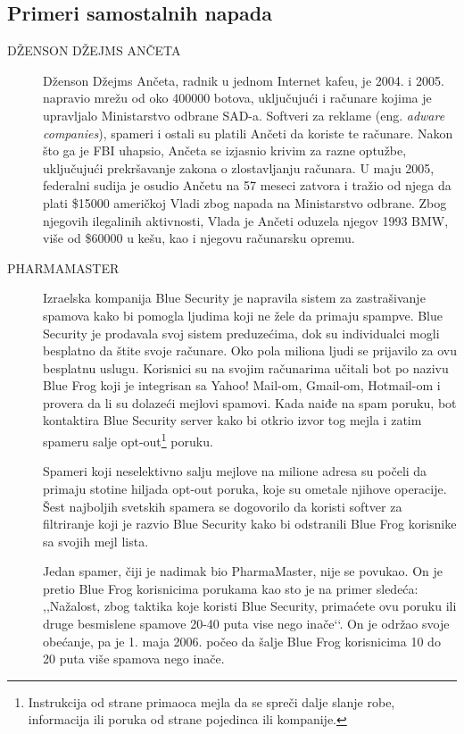 \documentclass[a4paper]{article}
\theoremstyle{break}
\begin{document}
{\subsection{Primeri samostalnih napada}
\label{subsec:primeri_samo_napada}

\begin{description}
\item[DŽENSON DŽEJMS ANČETA] Dženson Džejms Ančeta, radnik u jednom Internet kafeu, je 2004. i 2005. napravio mrežu od oko 400000 botova, uključujući i računare kojima je upravljalo Ministarstvo odbrane SAD-a. Softveri za reklame (eng. {\em adware companies}), spameri i ostali su platili Ančeti da koriste te računare. Nakon što ga je FBI uhapsio, Ančeta se izjasnio krivim za razne optužbe, uključujući prekršavanje zakona o zlostavljanju računara. U maju 2005, federalni sudija je osudio Ančetu na 57 meseci zatvora i tražio od njega da plati \$15000 američkoj Vladi zbog napada na Ministarstvo odbrane. Zbog njegovih ilegalinih aktivnosti, Vlada je Ančeti oduzela njegov 1993 BMW, više od \$60000 u kešu, kao i njegovu računarsku opremu.


\item[PHARMAMASTER] Izraelska kompanija Blue Security je napravila sistem za zastrašivanje spamova kako bi pomogla ljudima koji ne žele da primaju spampve. Blue Security je prodavala svoj sistem preduzećima, dok su individualci mogli besplatno da štite svoje računare. Oko pola miliona ljudi se prijavilo za ovu besplatnu uslugu. Korisnici su na svojim računarima učitali bot po nazivu Blue Frog koji je integrisan sa Yahoo! Mail-om, Gmail-om, Hotmail-om i provera da li su dolazeći mejlovi spamovi. Kada naiđe na spam poruku, bot kontaktira Blue Security server kako bi otkrio izvor tog mejla i zatim spameru salje opt-out\footnote{Instrukcija od strane primaoca mejla da se spreči dalje slanje robe, informacija ili poruka od strane pojedinca ili kompanije.} poruku.

Spameri koji neselektivno salju mejlove na milione adresa su počeli da primaju stotine hiljada opt-out poruka, koje su ometale njihove operacije. Šest najboljih svetskih spamera se dogovorilo da koristi softver za filtriranje koji je razvio Blue Security kako bi odstranili Blue Frog korisnike sa svojih mejl lista.

Jedan spamer, čiji je nadimak bio PharmaMaster, nije se povukao. On je pretio Blue Frog korisnicima porukama kao sto je na primer sledeća: ,,Nažalost, zbog taktika koje koristi Blue Security, primaćete ovu poruku ili druge besmislene spamove 20-40 puta vise nego inače‘‘. On je održao svoje obećanje, pa je 1. maja 2006. počeo da šalje Blue Frog korisnicima 10 do 20 puta više spamova nego inače.


\end{description}}
\end{document}
